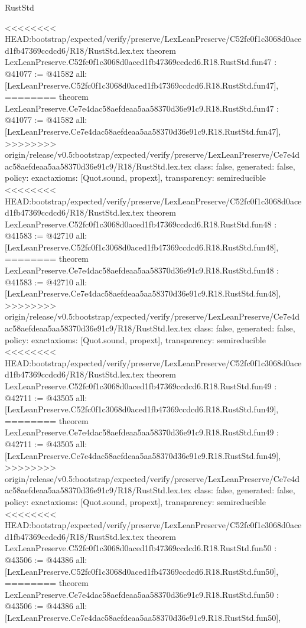 \begin{lexlean}{RustStd}
\begin{coremodule}
{\begin{coremodule}
{{{{{{{{{{{{{{{{{{{{{{{{{{{{{{{{{{{{{{{{{{{{{{{{{{}
<<<<<<<< HEAD:bootstrap/expected/verify/preserve/LexLeanPreserve/C52fc0f1c3068d0aced1fb47369ccdcd6/R18/RustStd.lex.tex
theorem LexLeanPreserve.C52fc0f1c3068d0aced1fb47369ccdcd6.R18.RustStd.fun47 : @41077 := @41582 {
  all: [LexLeanPreserve.C52fc0f1c3068d0aced1fb47369ccdcd6.R18.RustStd.fun47],
========
theorem LexLeanPreserve.Ce7e4dac58aefdeaa5aa58370d36e91c9.R18.RustStd.fun47 : @41077 := @41582 {
  all: [LexLeanPreserve.Ce7e4dac58aefdeaa5aa58370d36e91c9.R18.RustStd.fun47],
>>>>>>>> origin/release/v0.5:bootstrap/expected/verify/preserve/LexLeanPreserve/Ce7e4dac58aefdeaa5aa58370d36e91c9/R18/RustStd.lex.tex
  class: false,
  generated: false,
  policy: exact{axioms: [Quot.sound, propext]},
  transparency: semireducible
}
<<<<<<<< HEAD:bootstrap/expected/verify/preserve/LexLeanPreserve/C52fc0f1c3068d0aced1fb47369ccdcd6/R18/RustStd.lex.tex
theorem LexLeanPreserve.C52fc0f1c3068d0aced1fb47369ccdcd6.R18.RustStd.fun48 : @41583 := @42710 {
  all: [LexLeanPreserve.C52fc0f1c3068d0aced1fb47369ccdcd6.R18.RustStd.fun48],
========
theorem LexLeanPreserve.Ce7e4dac58aefdeaa5aa58370d36e91c9.R18.RustStd.fun48 : @41583 := @42710 {
  all: [LexLeanPreserve.Ce7e4dac58aefdeaa5aa58370d36e91c9.R18.RustStd.fun48],
>>>>>>>> origin/release/v0.5:bootstrap/expected/verify/preserve/LexLeanPreserve/Ce7e4dac58aefdeaa5aa58370d36e91c9/R18/RustStd.lex.tex
  class: false,
  generated: false,
  policy: exact{axioms: [Quot.sound, propext]},
  transparency: semireducible
}
<<<<<<<< HEAD:bootstrap/expected/verify/preserve/LexLeanPreserve/C52fc0f1c3068d0aced1fb47369ccdcd6/R18/RustStd.lex.tex
theorem LexLeanPreserve.C52fc0f1c3068d0aced1fb47369ccdcd6.R18.RustStd.fun49 : @42711 := @43505 {
  all: [LexLeanPreserve.C52fc0f1c3068d0aced1fb47369ccdcd6.R18.RustStd.fun49],
========
theorem LexLeanPreserve.Ce7e4dac58aefdeaa5aa58370d36e91c9.R18.RustStd.fun49 : @42711 := @43505 {
  all: [LexLeanPreserve.Ce7e4dac58aefdeaa5aa58370d36e91c9.R18.RustStd.fun49],
>>>>>>>> origin/release/v0.5:bootstrap/expected/verify/preserve/LexLeanPreserve/Ce7e4dac58aefdeaa5aa58370d36e91c9/R18/RustStd.lex.tex
  class: false,
  generated: false,
  policy: exact{axioms: [Quot.sound, propext]},
  transparency: semireducible
}
<<<<<<<< HEAD:bootstrap/expected/verify/preserve/LexLeanPreserve/C52fc0f1c3068d0aced1fb47369ccdcd6/R18/RustStd.lex.tex
theorem LexLeanPreserve.C52fc0f1c3068d0aced1fb47369ccdcd6.R18.RustStd.fun50 : @43506 := @44386 {
  all: [LexLeanPreserve.C52fc0f1c3068d0aced1fb47369ccdcd6.R18.RustStd.fun50],
========
theorem LexLeanPreserve.Ce7e4dac58aefdeaa5aa58370d36e91c9.R18.RustStd.fun50 : @43506 := @44386 {
  all: [LexLeanPreserve.Ce7e4dac58aefdeaa5aa58370d36e91c9.R18.RustStd.fun50],
}}}}}}}}}}}}}}}}}}}}}}}}}}}}}}}}}}}}}}}}}}}}}}}}}}}}}}
\end{coremodule}}
\end{coremodule}
\end{lexlean}
